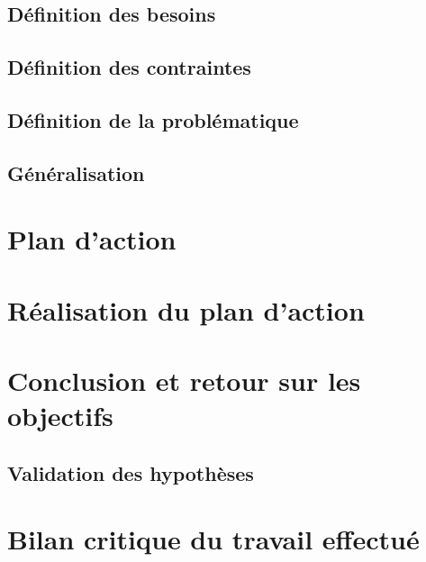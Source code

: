 \documentclass[a4paper,12pt]{article}
\begin{document}
\subsection{Définition des besoins}

\subsection{Définition des contraintes}

\subsection{Définition de la problématique}

\subsection{Généralisation}


\section{Plan d’action}


\section{Réalisation du plan d’action}


\section{Conclusion et retour sur les objectifs}
\subsection{Validation des hypothèses}


\section{Bilan critique du travail effectué}



\end{document}

